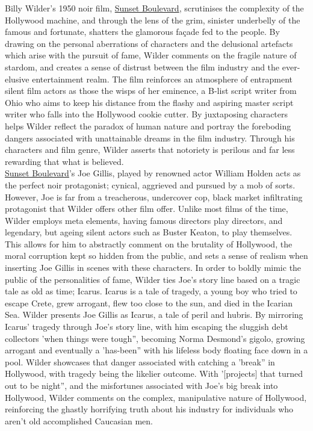 \documentclass[a4paper]{article}
\begin{document}
Billy Wilder’s 1950 noir film, \underline{Sunset Boulevard}, scrutinises the complexity of the Hollywood machine, and through the lens of the grim, sinister underbelly of the famous and fortunate, shatters the glamorous façade fed to the people. By drawing on the personal aberrations of characters and the delusional artefacts which arise with the pursuit of fame, Wilder comments on the fragile nature of stardom, and creates a sense of distrust between the film industry and the ever-elusive entertainment realm. The film reinforces an atmosphere of entrapment silent film actors as those the wisps of her eminence, a B-list script writer from Ohio who aims to keep his distance from the flashy and aspiring master script writer who falls into the Hollywood cookie cutter. By juxtaposing characters helps Wilder reflect the paradox of human nature and portray the foreboding dangers associated with unattainable dreams in the film industry. Through his characters and film genre, Wilder asserts that notoriety is perilous and far less rewarding that what is believed.\\

\underline{Sunset Boulevard}’s Joe Gillis, played by renowned actor William Holden acts as the perfect noir protagonist; cynical, aggrieved and pursued by a mob of sorts. However, Joe is far from a treacherous, undercover cop, black market infiltrating protagonist that Wilder offers other film offer. Unlike most films of the time, Wilder employs meta elements, having famous directors play directors, and legendary, but ageing silent actors such as Buster Keaton, to play themselves. This allows for him to abstractly comment on the brutality of Hollywood, the moral corruption kept so hidden from the public, and sets a sense of realism when inserting Joe Gillis in scenes with these characters. In order to boldly mimic the public of the personalities of fame, Wilder ties Joe’s story line based on a tragic tale as old as time; Icarus. Icarus is a tale of tragedy, a young boy who tried to escape Crete, grew arrogant, flew too close to the sun, and died in the Icarian Sea. Wilder presents Joe Gillis as Icarus, a tale of peril and hubris. By mirroring Icarus’ tragedy through Joe’s story line, with him escaping the sluggish debt collectors 'when things were tough”, becoming Norma Desmond’s gigolo, growing arrogant and eventually a 'has-been” with his lifeless body floating face down in a pool. Wilder showcases that danger associated with catching a 'break” in Hollywood, with tragedy being the likelier outcome. With '[projects] that turned out to be night”, and the misfortunes associated with Joe’s big break into Hollywood, Wilder comments on the complex, manipulative nature of Hollywood, reinforcing the ghastly horrifying truth about his industry for individuals who aren’t old accomplished Caucasian men.\\
\end{document}
